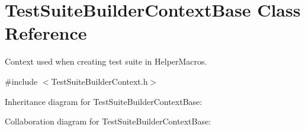 \hypertarget{class_test_suite_builder_context_base}{\section{Test\+Suite\+Builder\+Context\+Base Class Reference}
\label{class_test_suite_builder_context_base}
}


Context used when creating test suite in Helper\+Macros.  




{\ttfamily \#include $<$Test\+Suite\+Builder\+Context.\+h$>$}



Inheritance diagram for Test\+Suite\+Builder\+Context\+Base\+:


Collaboration diagram for Test\+Suite\+Builder\+Context\+Base\+:
